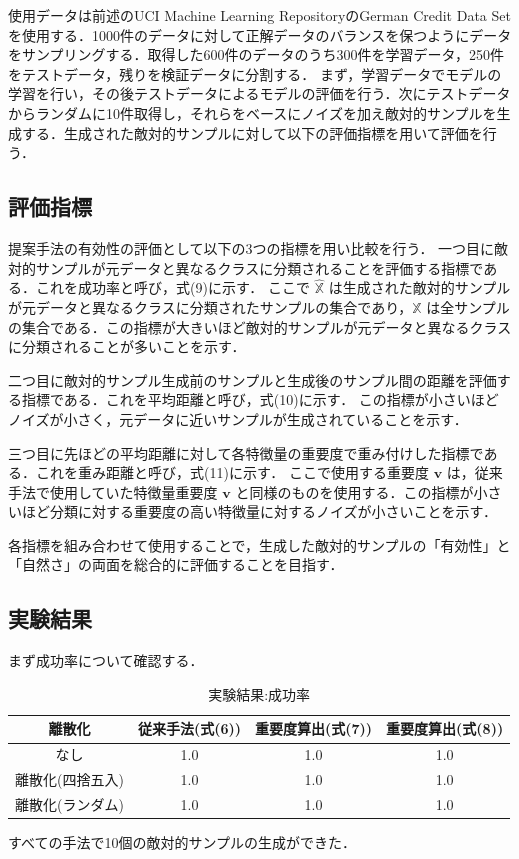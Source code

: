使用データは前述のUCI Machine Learning RepositoryのGerman Credit Data Setを使用する．1000件のデータに対して正解データのバランスを保つようにデータをサンプリングする．取得した600件のデータのうち300件を学習データ，250件をテストデータ，残りを検証データに分割する．
まず，学習データでモデルの学習を行い，その後テストデータによるモデルの評価を行う．次にテストデータからランダムに10件取得し，それらをベースにノイズを加え敵対的サンプルを生成する．生成された敵対的サンプルに対して以下の評価指標を用いて評価を行う．

\subsection{評価指標}
提案手法の有効性の評価として以下の3つの指標を用い比較を行う．
一つ目に敵対的サンプルが元データと異なるクラスに分類されることを評価する指標である．これを成功率と呼び，式(9)に示す．
ここで $\hat{\mathbb{X}}$ は生成された敵対的サンプルが元データと異なるクラスに分類されたサンプルの集合であり，$\mathbb{X}$ は全サンプルの集合である．この指標が大きいほど敵対的サンプルが元データと異なるクラスに分類されることが多いことを示す．

二つ目に敵対的サンプル生成前のサンプルと生成後のサンプル間の距離を評価する指標である．これを平均距離と呼び，式(10)に示す．
この指標が小さいほどノイズが小さく，元データに近いサンプルが生成されていることを示す．

三つ目に先ほどの平均距離に対して各特徴量の重要度で重み付けした指標である．これを重み距離と呼び，式(11)に示す．
ここで使用する重要度 $\bm{v}$ は，従来手法で使用していた特徴量重要度 $\bm{v}$ と同様のものを使用する．この指標が小さいほど分類に対する重要度の高い特徴量に対するノイズが小さいことを示す．

各指標を組み合わせて使用することで，生成した敵対的サンプルの「有効性」と「自然さ」の両面を総合的に評価することを目指す．

\subsection{実験結果}
まず成功率について確認する．
\begin{table}[H]
    \centering
    \caption{実験結果:成功率}
    \begin{tabular}{|c|c|c|c|} \hline
        離散化 & 従来手法(式(6)) & 重要度算出(式(7)) & 重要度算出(式(8)) \\ \hline
        なし & 1.0 & 1.0 & 1.0 \\ \hline
        離散化(四捨五入) & 1.0 & 1.0 & 1.0 \\ \hline
        離散化(ランダム) & 1.0 & 1.0 & 1.0 \\ \hline
    \end{tabular}
\end{table}
すべての手法で10個の敵対的サンプルの生成ができた．

